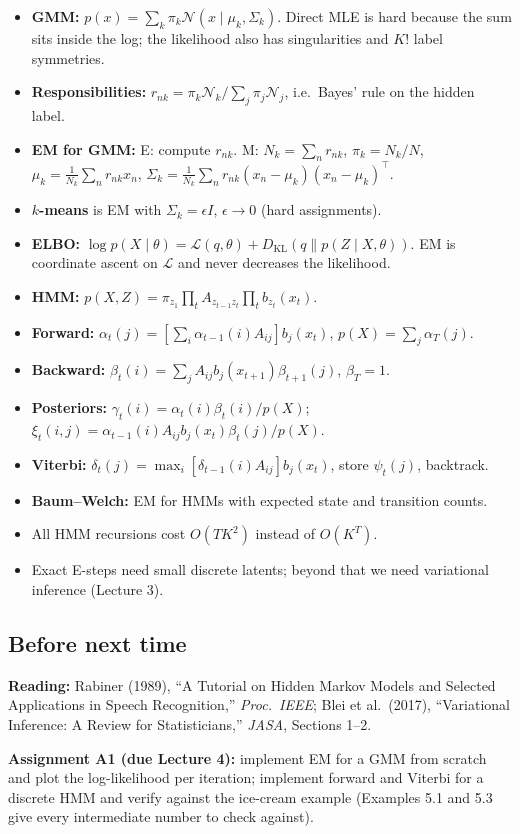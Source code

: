 \documentclass[11pt,a4paper]{article}
\newcommand{\N}{\mathcal{N}}
\newcommand{\KL}{D_{\mathrm{KL}}}
\newcommand{\Lb}{\mathcal{L}}
\begin{document}
\begin{itemize}[leftmargin=*]
\item \textbf{GMM:} $p(x)=\sum_k\pi_k\N(x\mid\mu_k,\Sigma_k)$. Direct MLE is hard because the sum sits inside the log; the likelihood also has singularities and $K!$ label symmetries.
\item \textbf{Responsibilities:} $r_{nk}=\pi_k\N_k/\sum_j\pi_j\N_j$, i.e.\ Bayes' rule on the hidden label.
\item \textbf{EM for GMM:} E: compute $r_{nk}$. M: $N_k=\sum_nr_{nk}$, $\pi_k=N_k/N$, $\mu_k=\frac1{N_k}\sum_nr_{nk}x_n$, $\Sigma_k=\frac1{N_k}\sum_nr_{nk}(x_n-\mu_k)(x_n-\mu_k)^\top$.
\item \textbf{$k$-means} is EM with $\Sigma_k=\epsilon I$, $\epsilon\to0$ (hard assignments).
\item \textbf{ELBO:} $\log p(X\mid\theta)=\Lb(q,\theta)+\KL(q\|p(Z\mid X,\theta))$. EM is coordinate ascent on $\Lb$ and never decreases the likelihood.
\item \textbf{HMM:} $p(X,Z)=\pi_{z_1}\prod_tA_{z_{t-1}z_t}\prod_tb_{z_t}(x_t)$.
\item \textbf{Forward:} $\alpha_t(j)=[\sum_i\alpha_{t-1}(i)A_{ij}]b_j(x_t)$, $p(X)=\sum_j\alpha_T(j)$.
\item \textbf{Backward:} $\beta_t(i)=\sum_jA_{ij}b_j(x_{t+1})\beta_{t+1}(j)$, $\beta_T=1$.
\item \textbf{Posteriors:} $\gamma_t(i)=\alpha_t(i)\beta_t(i)/p(X)$; $\xi_t(i,j)=\alpha_{t-1}(i)A_{ij}b_j(x_t)\beta_t(j)/p(X)$.
\item \textbf{Viterbi:} $\delta_t(j)=\max_i[\delta_{t-1}(i)A_{ij}]b_j(x_t)$, store $\psi_t(j)$, backtrack.
\item \textbf{Baum--Welch:} EM for HMMs with expected state and transition counts.
\item All HMM recursions cost $O(TK^2)$ instead of $O(K^T)$.
\item Exact E-steps need small discrete latents; beyond that we need variational inference (Lecture 3).
\end{itemize}

\subsection*{Before next time}
\textbf{Reading:} Rabiner (1989), ``A Tutorial on Hidden Markov Models and Selected Applications in Speech Recognition,'' \emph{Proc.\ IEEE}; Blei et al.\ (2017), ``Variational Inference: A Review for Statisticians,'' \emph{JASA}, Sections 1--2.

\textbf{Assignment A1 (due Lecture 4):} implement EM for a GMM from scratch and plot the log-likelihood per iteration; implement forward and Viterbi for a discrete HMM and verify against the ice-cream example (Examples 5.1 and 5.3 give every intermediate number to check against).
\end{document}
